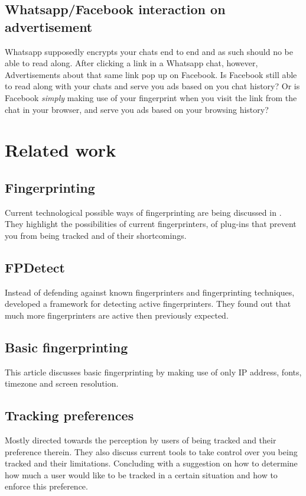 \subsection{Whatsapp/Facebook interaction on advertisement}
Whatsapp supposedly encrypts your chats end to end
and as such should no be able to read along.
After clicking a link in a Whatsapp chat, however,
Advertisements about that same link pop up on Facebook.
Is Facebook still able to read along with your chats
and serve you ads based on you chat history?
Or is Facebook \emph{simply} making use of your fingerprint
when you visit the link from the chat in your browser,
and serve you ads based on your browsing history?

\section{Related work}

\subsection{Fingerprinting}

Current technological possible ways of fingerprinting
are being discussed in \citep{nikiforakis2014workings}.
They highlight the possibilities of current fingerprinters,
of plug-ins that prevent you from being tracked
and of their shortcomings.

\subsection{FPDetect}

Instead of defending against known fingerprinters
and fingerprinting techniques,
\citep{acar2013fpdetective} developed a framework
for detecting active fingerprinters.
They found out
that much more fingerprinters are active then previously expected.

\subsection{Basic fingerprinting}

This article discusses basic fingerprinting
by making use of only IP address, fonts, timezone and screen resolution.
\citep{boda2011user}

\subsection{Tracking preferences}

Mostly directed towards the perception by users of being tracked
and their preference therein.
\citep{melicher2015not}
They also discuss current tools to take control over you being tracked
and their limitations.
Concluding with a suggestion on how to determine
how much a user would like to be tracked in a certain situation
and how to enforce this preference.
